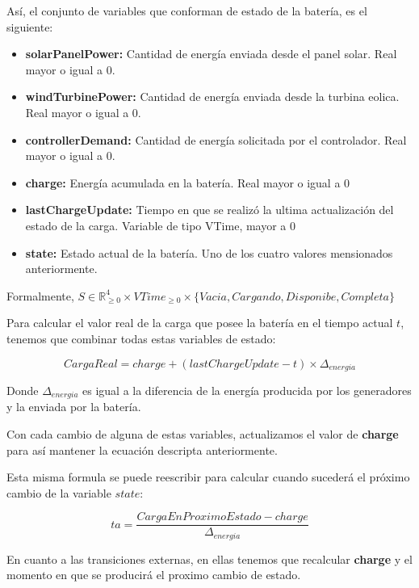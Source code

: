 Así, el conjunto de variables que conforman de estado de la batería, es el siguiente:

\begin{itemize}
    \item \textbf{solarPanelPower:} Cantidad de energía enviada desde el panel solar.  Real mayor o igual a 0.
    \item \textbf{windTurbinePower:} Cantidad de energía enviada desde la turbina eolica.  Real mayor o igual a 0.
    \item \textbf{controllerDemand:} Cantidad de energía solicitada por el controlador. Real mayor o igual a 0.
    \item \textbf{charge:} Energía acumulada en la batería. Real mayor o igual a 0
    \item \textbf{lastChargeUpdate:} Tiempo en que se realizó la ultima actualización del estado de la carga.
    Variable de tipo VTime, mayor a 0
    \item \textbf{state:} Estado actual de la batería. Uno de los cuatro valores mensionados anteriormente.
\end{itemize}

Formalmente, $S \in \mathbb{R}_{\geq 0}^4 \times VTime_{\geq 0} \times \{Vacia, Cargando, Disponibe, Completa\}$ 

Para calcular el valor real de la carga que posee la batería en el tiempo actual $t$, 
tenemos que combinar todas estas variables de estado:

$$CargaReal = charge+(lastChargeUpdate - t) \times \Delta_{energia}$$

Donde $\Delta_{energia}$ es igual a la diferencia de la energía producida por los generadores y la enviada
por la batería.

Con cada cambio de alguna de estas variables, actualizamos el valor de \textbf{charge} para así
mantener la ecuación descripta anteriormente.

Esta misma formula se puede reescribir para calcular cuando sucederá el próximo cambio de la variable $state$:

$$ta = \frac{CargaEnProximoEstado - charge}{\Delta_{energia}}$$

En cuanto a las transiciones externas, en ellas tenemos que recalcular \textbf{charge} y el momento en que se
producirá el proximo cambio de estado.


